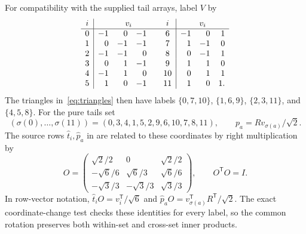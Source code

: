 For compatibility with the supplied tail arrays, label $V$ by
\begin{equation}\label{eq:tail-labels}
\begin{array}{c|rrr@{\qquad}c|rrr}
i&\multicolumn{3}{c}{v_i}&i&\multicolumn{3}{c}{v_i}\\\hline
0&-1&0&-1&6&-1&0&1\\
1&0&-1&-1&7&1&-1&0\\
2&-1&-1&0&8&0&-1&1\\
3&0&1&-1&9&1&1&0\\
4&-1&1&0&10&0&1&1\\
5&1&0&-1&11&1&0&1.
\end{array}
\end{equation}
The triangles in~\eqref{eq:triangles} then have labels
$\{0,7,10\}$, $\{1,6,9\}$, $\{2,3,11\}$, and $\{4,5,8\}$.
For the pure tails set
\[
 (\sigma(0),\ldots,\sigma(11))=(0,3,4,1,5,2,9,6,10,7,8,11),
 \qquad p_a=Rv_{\sigma(a)}/\sqrt2.
\]
The source rows $\widehat t_i,\widehat p_a$ in
are related to these coordinates by right multiplication by
\begin{equation}\label{eq:tail-map}
 O=\begin{pmatrix}
 \sqrt2/2&0&\sqrt2/2\\
 -\sqrt6/6&\sqrt6/3&\sqrt6/6\\
 -\sqrt3/3&-\sqrt3/3&\sqrt3/3
 \end{pmatrix},\qquad O^{\mathsf T}O=I.
\end{equation}
In row-vector notation,
$\widehat t_iO=v_i^{\mathsf T}/\sqrt6$ and
$\widehat p_aO=v_{\sigma(a)}^{\mathsf T}R^{\mathsf T}/\sqrt2$.
The exact coordinate-change test checks these identities for every
label, so the common rotation preserves both within-set and cross-set
inner products.
